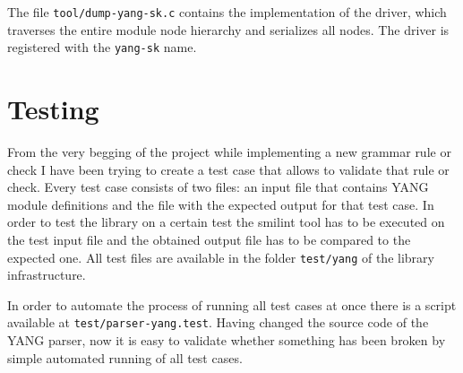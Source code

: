 \documentclass[conference]{IEEEtran}
\begin{document}
The file \texttt{tool/dump-yang-sk.c} contains the implementation of the driver, which traverses the entire module node hierarchy and serializes all nodes. The driver is registered with the \texttt{yang-sk} name.

\section{Testing}
From the very begging of the project  while implementing a new grammar rule or check I have been trying to create a test case that allows to validate that rule or check. Every test case consists of two files: an input file that contains YANG module definitions and the file with the expected output for that test case. In order to test the library on a certain test the smilint tool has to be executed on the test input file and the obtained output file has to be compared to the expected one. All test files are available in the folder 	\texttt{test/yang} of the library infrastructure.

In order to automate the process of running all test cases at once there is a script available at \texttt{test/parser-yang.test}. Having changed the source code of the YANG parser, now it is easy to validate whether something has been broken by simple automated running of all test cases.
\end{document}
